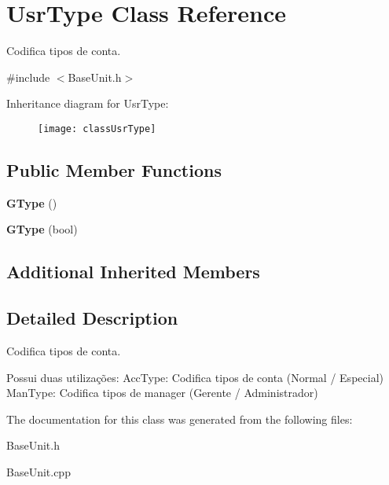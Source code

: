 \hypertarget{classUsrType}{\section{Usr\-Type Class Reference}
\label{classUsrType}
}


Codifica tipos de conta.  




{\ttfamily \#include $<$Base\-Unit.\-h$>$}

Inheritance diagram for Usr\-Type\-:\begin{figure}[H]
\begin{center}
\leavevmode
\texttt{[image: classUsrType]}
\end{center}
\end{figure}
\subsection*{Public Member Functions}
\begin{DoxyCompactItemize}
\item 
\hypertarget{classUsrType_a551a40c57ccc7dec21a42e539ff5899c}{{\bfseries G\-Type} ()}\label{classUsrType_a551a40c57ccc7dec21a42e539ff5899c}

\item 
\hypertarget{classUsrType_a4b88730c90e740fa4e9ca4d247ee8616}{{\bfseries G\-Type} (bool)}\label{classUsrType_a4b88730c90e740fa4e9ca4d247ee8616}

\end{DoxyCompactItemize}
\subsection*{Additional Inherited Members}


\subsection{Detailed Description}
Codifica tipos de conta. 

Possui duas utilizações\-: Acc\-Type\-: Codifica tipos de conta (Normal / Especial) Man\-Type\-: Codifica tipos de manager (Gerente / Administrador) 

The documentation for this class was generated from the following files\-:\begin{DoxyCompactItemize}
\item 
Base\-Unit.\-h\item 
Base\-Unit.\-cpp\end{DoxyCompactItemize}

